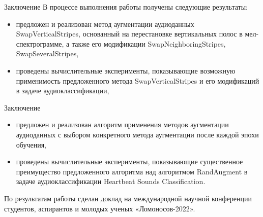 \documentclass[12pt, fleqn]{beamer}
\begin{document}
\begin{frame}{Заключение}
	В процессе выполнения работы получены следующие результаты:
	\begin{itemize}
		\item предложен и реализован метод аугментации аудиоданных SwapVerticalStripes, основанный на перестановке вертикальных полос в мел-спектрограмме, а также его модификации SwapNeighboringStripes, SwapSeveralStripes,
		\item проведены вычислительные эксперименты, показывающие возможную применимость предложенного метода SwapVerticalStripes и его модификаций в задаче аудиоклассификации,
	\end{itemize}
\end{frame}

\begin{frame}{Заключение}
	\begin{itemize}
		\item предложен и реализован алгоритм применения методов аугментации аудиоданных с выбором конкретного метода аугментации после каждой эпохи обучения,
		\item проведены вычислительные эксперименты, показывающие существенное преимущество предложенного алгоритма над алгоритмом RandAugment в задаче аудиоклассификации Heartbeat Sounds Classification.
	\end{itemize}
	По результатам работы сделан доклад на международной научной конференции
студентов, аспирантов и молодых ученых «Ломоносов-2022».
\end{frame}
\end{document}
